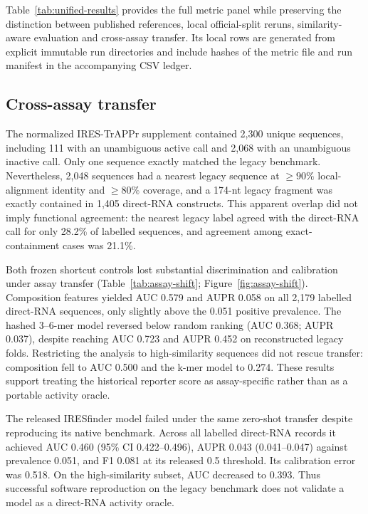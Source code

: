 

Table~\ref{tab:unified-results} provides the full metric panel while preserving the distinction
between published references, local official-split reruns, similarity-aware evaluation and
cross-assay transfer. Its local rows are generated from explicit immutable run directories and
include hashes of the metric file and run manifest in the accompanying CSV ledger.



\subsection{Cross-assay transfer}
The normalized IRES-TrAPPr supplement contained 2,300 unique sequences, including 111 with an
unambiguous active call and 2,068 with an unambiguous inactive call. Only one sequence exactly
matched the legacy benchmark. Nevertheless, 2,048 sequences had a nearest legacy sequence at
$\geq90\%$ local-alignment identity and $\geq80\%$ coverage, and a 174-nt legacy fragment was
exactly contained in 1,405 direct-RNA constructs. This apparent overlap did not imply functional
agreement: the nearest legacy label agreed with the direct-RNA call for only 28.2\% of labelled
sequences, and agreement among exact-containment cases was 21.1\%.

Both frozen shortcut controls lost substantial discrimination and calibration under assay transfer
(Table~\ref{tab:assay-shift}; Figure~\ref{fig:assay-shift}). Composition features yielded AUC
0.579 and AUPR 0.058 on all 2,179 labelled direct-RNA sequences, only slightly above the 0.051
positive prevalence. The hashed 3--6-mer model reversed below random ranking (AUC 0.368; AUPR
0.037), despite reaching AUC 0.723 and AUPR 0.452 on reconstructed legacy folds. Restricting the
analysis to high-similarity sequences did not rescue transfer: composition fell to AUC 0.500 and
the k-mer model to 0.274. These results support treating the historical reporter score as
assay-specific rather than as a portable activity oracle.

The released IRESfinder model failed under the same zero-shot transfer despite reproducing its
native benchmark. Across all labelled direct-RNA records it achieved AUC 0.460 (95\% CI
0.422--0.496), AUPR 0.043 (0.041--0.047) against prevalence 0.051, and F1 0.081 at its released
0.5 threshold. Its calibration error was 0.518. On the high-similarity subset, AUC decreased to
0.393. Thus successful software reproduction on the legacy benchmark does not validate a model as
a direct-RNA activity oracle.

